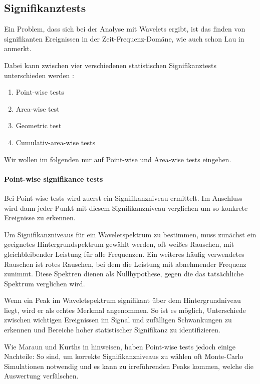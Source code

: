 \subsection{Signifikanztests}

Ein Problem, dass sich bei der Analyse mit Wavelets ergibt, ist das finden von signifikanten Ereignissen in der Zeit-Frequenz-Domäne, wie auch schon Lau in \cite[2401]{Lau1995} anmerkt. 

Dabei kann zwischen vier verschiedenen statistischen Signifikanztests unterschieden werden \cite{Schulte2019}:

\begin{enumerate}
    \item Point-wise tests
    \item Area-wise test
    \item Geometric test
    \item Cumulativ-area-wise tests
\end{enumerate}

Wir wollen im folgenden nur auf Point-wise und Area-wise tests eingehen.

\paragraph{Point-wise signifikance tests}
Bei Point-wise tests wird zuerst ein Signifikanzniveau ermittelt. Im Anschluss wird dann jeder Punkt mit diesem Signifikanzniveau verglichen um so konkrete Ereignisse zu erkennen.

Um Signifikanzniveaus für ein Waveletspektrum zu bestimmen, muss zunächst ein geeignetes Hintergrundspektrum gewählt werden, oft weißes Rauschen, mit gleichbleibender Leistung für alle Frequenzen. Ein weiteres häufig verwendetes Rauschen ist rotes Rauschen, bei dem die Leistung mit abnehmender Frequenz zunimmt. Diese Spektren dienen als Nullhypothese, gegen die das tatsächliche Spektrum verglichen wird. \cite[67f]{Torrence1998}

Wenn ein Peak im Waveletspektrum signifikant über dem Hintergrundniveau liegt, wird er als echtes Merkmal angenommen. So ist es möglich, Unterschiede zwischen wichtigen Ereignissen im Signal und zufälligen Schwankungen zu erkennen und Bereiche hoher statistischer Signifikanz zu identifizieren.

Wie Maraun und Kurths in \cite[511]{Maraun2004} hinweisen, haben Point-wise tests jedoch einige Nachteile:
So sind, um korrekte Signifikanzniveaus zu wählen oft Monte-Carlo Simulationen notwendig und es kann zu irreführenden Peaks kommen, welche die Auswertung verfälschen.


